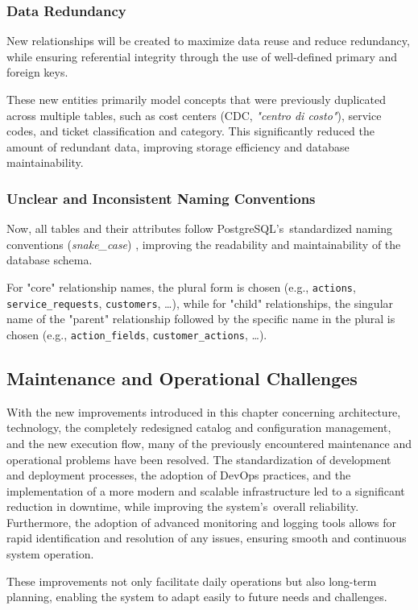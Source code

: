 \subsubsection{Data Redundancy}
New relationships will be created to maximize data reuse and reduce redundancy, while ensuring referential integrity through the use of well-defined primary and foreign keys.

These new entities primarily model concepts that were previously duplicated across multiple tables, such as cost centers (CDC, \textit{"centro di costo"}), service codes, and ticket classification and category. This significantly reduced the amount of redundant data, improving storage efficiency and database maintainability.

\subsubsection{Unclear and Inconsistent Naming Conventions}
Now, all tables and their attributes follow PostgreSQL's~standardized naming conventions (\textit{snake\_case}) \cite{postgres_implementation}, improving the readability and maintainability of the database schema.

For "core" relationship names, the plural form is chosen (e.g., \texttt{actions}, \texttt{service\_requests}, \texttt{customers}, \dots), while for "child" relationships, the singular name of the "parent" relationship followed by the specific name in the plural is chosen (e.g., \texttt{action\_fields}, \texttt{customer\_actions}, \dots).

\subsection{Maintenance and Operational Challenges}
With the new improvements introduced in this chapter concerning architecture, technology, the completely redesigned catalog and configuration management, and the new execution flow, many of the previously encountered maintenance and operational problems have been resolved. The standardization of development and deployment processes, the adoption of DevOps practices, and the implementation of a more modern and scalable infrastructure led to a significant reduction in downtime, while improving the system's~overall reliability. Furthermore, the adoption of advanced monitoring and logging tools allows for rapid identification and resolution of any issues, ensuring smooth and continuous system operation.

These improvements not only facilitate daily operations but also long-term planning, enabling the system to adapt easily to future needs and challenges.